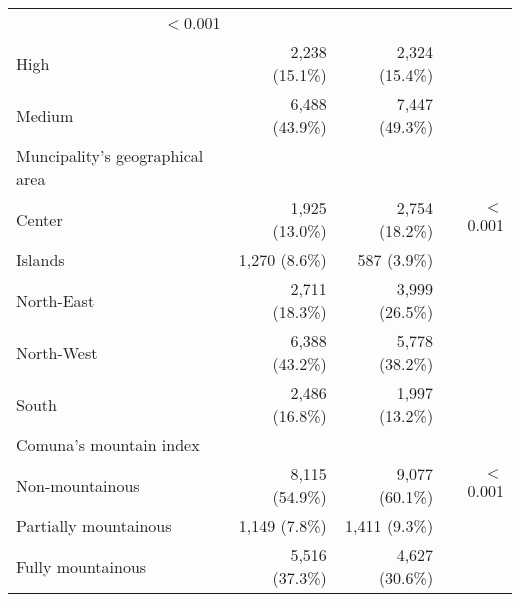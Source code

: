 \documentclass{article}
\begin{document}
\begin{table}[!h]
\begin{tabular}{llll}
  \multicolumn{1}{r}{$<$0.001} \\
\multicolumn{1}{l}{\hspace{1em}High} &
  \multicolumn{1}{r}{2,238 (15.1\%)} &
  \multicolumn{1}{r}{2,324 (15.4\%)} &
  \multicolumn{1}{r}{} \\
\multicolumn{1}{l}{\hspace{1em}Medium} &
  \multicolumn{1}{r}{6,488 (43.9\%)} &
  \multicolumn{1}{r}{7,447 (49.3\%)} &
  \multicolumn{1}{r}{} \\
\multicolumn{1}{l}{Muncipality's geographical area} &
  \multicolumn{1}{r}{} &
  \multicolumn{1}{r}{} &
  \multicolumn{1}{r}{} \\
\multicolumn{1}{l}{\hspace{1em}Center} &
  \multicolumn{1}{r}{1,925 (13.0\%)} &
  \multicolumn{1}{r}{2,754 (18.2\%)} &
  \multicolumn{1}{r}{$<$0.001} \\
\multicolumn{1}{l}{\hspace{1em}Islands} &
  \multicolumn{1}{r}{1,270 (8.6\%)} &
  \multicolumn{1}{r}{587 (3.9\%)} &
  \multicolumn{1}{r}{} \\
\multicolumn{1}{l}{\hspace{1em}North-East} &
  \multicolumn{1}{r}{2,711 (18.3\%)} &
  \multicolumn{1}{r}{3,999 (26.5\%)} &
  \multicolumn{1}{r}{} \\
\multicolumn{1}{l}{\hspace{1em}North-West} &
  \multicolumn{1}{r}{6,388 (43.2\%)} &
  \multicolumn{1}{r}{5,778 (38.2\%)} &
  \multicolumn{1}{r}{} \\
\multicolumn{1}{l}{\hspace{1em}South} &
  \multicolumn{1}{r}{2,486 (16.8\%)} &
  \multicolumn{1}{r}{1,997 (13.2\%)} &
  \multicolumn{1}{r}{} \\
\multicolumn{1}{l}{Comuna's mountain index} &
  \multicolumn{1}{r}{} &
  \multicolumn{1}{r}{} &
  \multicolumn{1}{r}{} \\
\multicolumn{1}{l}{\hspace{1em}Non-mountainous} &
  \multicolumn{1}{r}{8,115 (54.9\%)} &
  \multicolumn{1}{r}{9,077 (60.1\%)} &
  \multicolumn{1}{r}{$<$0.001} \\
\multicolumn{1}{l}{\hspace{1em}Partially mountainous} &
  \multicolumn{1}{r}{1,149 (7.8\%)} &
  \multicolumn{1}{r}{1,411 (9.3\%)} &
  \multicolumn{1}{r}{} \\
\multicolumn{1}{l}{\hspace{1em}Fully mountainous} &
  \multicolumn{1}{r}{5,516 (37.3\%)} &
  \multicolumn{1}{r}{4,627 (30.6\%)} &
  \multicolumn{1}{r}{} \\
\cline{1-4}
\end{tabular}
\end{table}
\end{document}

